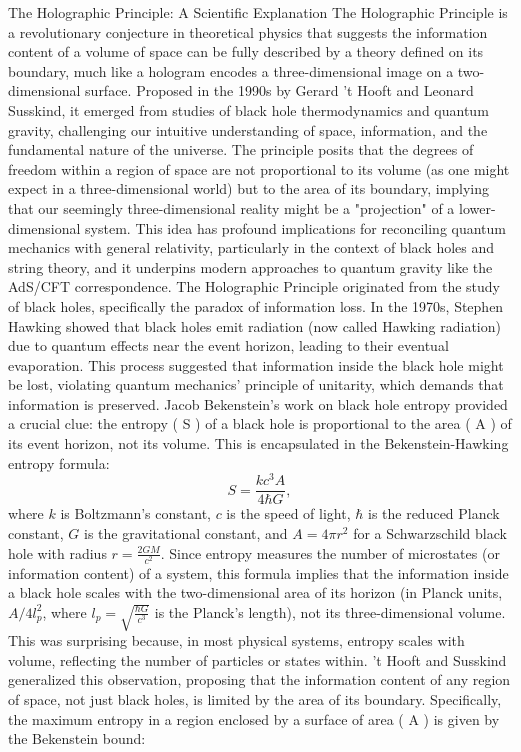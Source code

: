The Holographic Principle: A Scientific Explanation
The Holographic Principle is a revolutionary conjecture in theoretical physics that suggests the information content of a volume of space can be fully described by a theory defined on its boundary, much like a hologram encodes a three-dimensional image on a two-dimensional surface. Proposed in the 1990s by Gerard ’t Hooft and Leonard Susskind, it emerged from studies of black hole thermodynamics and quantum gravity, challenging our intuitive understanding of space, information, and the fundamental nature of the universe. The principle posits that the degrees of freedom within a region of space are not proportional to its volume (as one might expect in a three-dimensional world) but to the area of its boundary, implying that our seemingly three-dimensional reality might be a "projection" of a lower-dimensional system. This idea has profound implications for reconciling quantum mechanics with general relativity, particularly in the context of black holes and string theory, and it underpins modern approaches to quantum gravity like the AdS/CFT correspondence.
The Holographic Principle originated from the study of black holes, specifically the paradox of information loss. In the 1970s, Stephen Hawking showed that black holes emit radiation (now called Hawking radiation) due to quantum effects near the event horizon, leading to their eventual evaporation. This process suggested that information inside the black hole might be lost, violating quantum mechanics’ principle of unitarity, which demands that information is preserved. Jacob Bekenstein’s work on black hole entropy provided a crucial clue: the entropy ( S ) of a black hole is proportional to the area ( A ) of its event horizon, not its volume. This is encapsulated in the Bekenstein-Hawking entropy formula:
$$ S = \frac{k c^3 A}{4 \hbar G}, $$
where \( k \) is Boltzmann’s constant, \( c \) is the speed of light, \( \hbar \) is the reduced Planck constant, \( G \) is the gravitational constant, and \( A = 4\pi r^2 \) for a Schwarzschild black hole with radius \( r = \frac{2GM}{c^2} \). Since entropy measures the number of microstates (or information content) of a system, this formula implies that the information inside a black hole scales with the two-dimensional area of its horizon (in Planck units, \( A/4l_p^2 \), where \( l_p = \sqrt{\frac{\hbar G}{c^3}} \) is the Planck's length), not its three-dimensional volume. This was surprising because, in most physical systems, entropy scales with volume, reflecting the number of particles or states within.
’t Hooft and Susskind generalized this observation, proposing that the information content of any region of space, not just black holes, is limited by the area of its boundary. Specifically, the maximum entropy in a region enclosed by a surface of area ( A ) is given by the Bekenstein bound:
